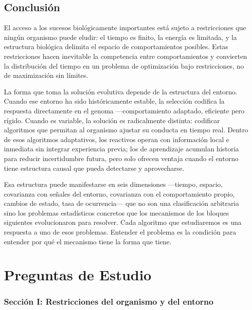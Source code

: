 \documentclass[
  letterpaper,
  DIV=11,
  numbers=noendperiod]{scrreprt}
\begin{document}
\section{Conclusión}\label{conclusiuxf3n}

El acceso a los sucesos biológicamente importantes está sujeto a
restricciones que ningún organismo puede eludir: el tiempo es finito, la
energía es limitada, y la estructura biológica delimita el espacio de
comportamientos posibles. Estas restricciones hacen inevitable la
competencia entre comportamientos y convierten la distribución del
tiempo en un problema de optimización bajo restricciones, no de
maximización sin límites.

La forma que toma la solución evolutiva depende de la estructura del
entorno. Cuando ese entorno ha sido históricamente estable, la selección
codifica la respuesta directamente en el genoma ---comportamiento
adaptado, eficiente pero rígido. Cuando es variable, la solución es
radicalmente distinta: codificar algoritmos que permitan al organismo
ajustar su conducta en tiempo real. Dentro de esos algoritmos
adaptativos, los reactivos operan con información local e inmediata sin
integrar experiencia previa; los de aprendizaje acumulan historia para
reducir incertidumbre futura, pero solo ofrecen ventaja cuando el
entorno tiene estructura causal que pueda detectarse y aprovecharse.

Esa estructura puede manifestarse en seis dimensiones ---tiempo,
espacio, covarianza con señales del entorno, covarianza con el
comportamiento propio, cambios de estado, tasa de ocurrencia--- que no
son una clasificación arbitraria sino los problemas estadísticos
concretos que los mecanismos de los bloques siguientes evolucionaron
para resolver. Cada algoritmo que estudiaremos es una respuesta a uno de
esos problemas. Entender el problema es la condición para entender por
qué el mecanismo tiene la forma que tiene.


\chapter{Preguntas de Estudio}\label{preguntas-de-estudio}

\subsection{Sección I: Restricciones del organismo y del
entorno}\label{secciuxf3n-i-restricciones-del-organismo-y-del-entorno}
\end{document}
